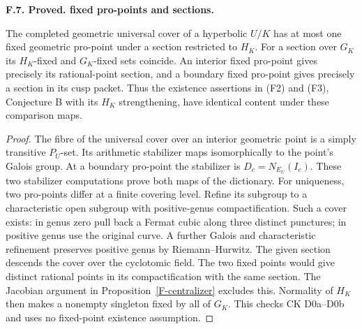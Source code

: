 \documentclass[11pt,oneside]{article}
\makeatletter
\newcounter{statementanchor}
\newenvironment{statement}[3]{%
 \refstepcounter{statementanchor}\def\@currentlabel{#1}%
 \par\addvspace{9pt}\noindent
 \textbf{#1. #2. #3.}\par\nobreak\noindent\ignorespaces
}{\par\addvspace{5pt}}
\makeatother
\begin{document}
\begin{statement}{F.7}{Proved}{fixed pro-points and sections}
\label{st:F.7}
\label{F-fixed-dictionary}
The completed geometric universal cover of a hyperbolic $U/K$
has at most one fixed geometric pro-point under a section restricted
to $H_K$. For a section over $G_K$ its $H_K$-fixed and $G_K$-fixed
sets coincide. An interior fixed pro-point gives precisely its
rational-point section, and a boundary fixed pro-point gives precisely
a section in its cusp packet. Thus the existence assertions in (F2)
and (F3), Conjecture B with its $H_K$ strengthening, have identical
content under these comparison maps.
\end{statement}
\begin{proof}
The fibre of the universal cover over an interior geometric point
is a simply transitive $P_U$-set. Its arithmetic stabilizer maps
isomorphically to the point's Galois group. At a boundary pro-point
the stabilizer is $D_c=N_{E_U}(I_c)$. These two stabilizer
computations prove both maps of the dictionary. For uniqueness,
two pro-points differ at a finite covering level. Refine its
subgroup to a characteristic open subgroup with positive-genus
compactification. Such a cover exists: in genus zero pull back a
Fermat cubic along three distinct punctures; in positive genus use
the original curve. A further Galois and characteristic refinement
preserves positive genus by Riemann--Hurwitz. The given section
descends the cover over the cyclotomic field. The two fixed points
would give distinct rational points in its compactification with
the same section. The Jacobian argument in
Proposition~\ref{F-centralizer} excludes this. Normality of $H_K$
then makes a nonempty singleton fixed by all of $G_K$. This checks
CK D0a--D0b and uses no fixed-point existence assumption.
\end{proof}
\end{document}
